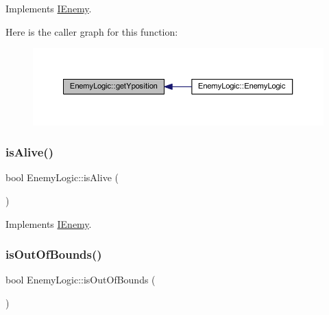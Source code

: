 Implements \hyperlink{class_i_enemy_a8011be7f510f6630250f8b9529815773}{I\+Enemy}.

Here is the caller graph for this function\+:
\nopagebreak
\begin{figure}[H]
\begin{center}
\leavevmode
\includegraphics[width=350pt]{class_enemy_logic_ae614032054926a4a25ed56f61111392b_icgraph}
\end{center}
\end{figure}
\mbox{\label{class_enemy_logic_a8dd48fa112c41249e46728d7ec8f820e}} 
\subsubsection{\texorpdfstring{is\+Alive()}{isAlive()}}
{\footnotesize\ttfamily bool Enemy\+Logic\+::is\+Alive (\begin{DoxyParamCaption}{ }\end{DoxyParamCaption})\hspace{0.3cm}{\ttfamily [virtual]}}



Implements \hyperlink{class_i_enemy_a3e44ca5e5fabcfd71b26657eba26e5a2}{I\+Enemy}.

\mbox{\label{class_enemy_logic_a2e3e9e006259b36745beff4b55fd9bdc}} 
\subsubsection{\texorpdfstring{is\+Out\+Of\+Bounds()}{isOutOfBounds()}}
{\footnotesize\ttfamily bool Enemy\+Logic\+::is\+Out\+Of\+Bounds (\begin{DoxyParamCaption}{ }\end{DoxyParamCaption})}

\mbox{\label{class_enemy_logic_a2bc8ba642d677ab31f4b54ec00299e25}} 
